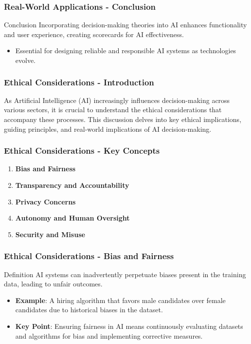 \documentclass[aspectratio=169]{beamer}
\begin{document}
\begin{frame}[fragile]
    \frametitle{Real-World Applications - Conclusion}
    \begin{block}{Conclusion}
        Incorporating decision-making theories into AI enhances functionality and user experience, creating scorecards for AI effectiveness.
        \begin{itemize}
            \item Essential for designing reliable and responsible AI systems as technologies evolve.
        \end{itemize}
    \end{block}
\end{frame}

\begin{frame}[fragile]
    \frametitle{Ethical Considerations - Introduction}
    As Artificial Intelligence (AI) increasingly influences decision-making across various sectors, it is crucial to understand the ethical considerations that accompany these processes. This discussion delves into key ethical implications, guiding principles, and real-world implications of AI decision-making.
\end{frame}

\begin{frame}[fragile]
    \frametitle{Ethical Considerations - Key Concepts}
    \begin{enumerate}
        \item \textbf{Bias and Fairness}
        \item \textbf{Transparency and Accountability}
        \item \textbf{Privacy Concerns}
        \item \textbf{Autonomy and Human Oversight}
        \item \textbf{Security and Misuse}
    \end{enumerate}
\end{frame}

\begin{frame}[fragile]
    \frametitle{Ethical Considerations - Bias and Fairness}
    \begin{block}{Definition}
        AI systems can inadvertently perpetuate biases present in the training data, leading to unfair outcomes.
    \end{block}
    \begin{itemize}
        \item \textbf{Example}: A hiring algorithm that favors male candidates over female candidates due to historical biases in the dataset.
        \item \textbf{Key Point}: Ensuring fairness in AI means continuously evaluating datasets and algorithms for bias and implementing corrective measures.
    \end{itemize}
\end{frame}
\end{document}
